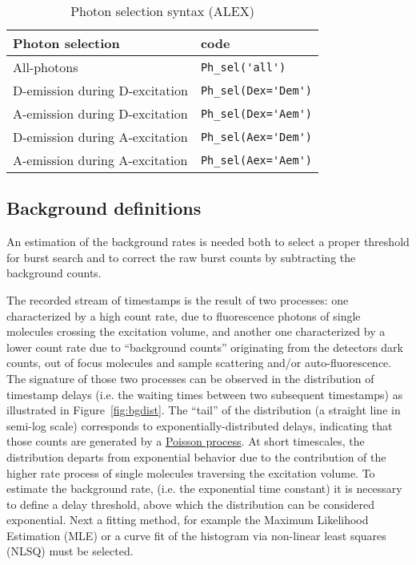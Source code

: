 \begin{table}
\begin{tabular}{l|l}
  Photon selection  & code \\
  \hline
  All-photons & \verb|Ph_sel('all')|\\
  D-emission during D-excitation & \verb|Ph_sel(Dex='Dem')|\\
  A-emission during D-excitation & \verb|Ph_sel(Dex='Aem')|\\
  D-emission during A-excitation & \verb|Ph_sel(Aex='Dem')|\\
  A-emission during A-excitation & \verb|Ph_sel(Aex='Aem')|\\
\end{tabular}
\caption{\label{tab:ph_sel_alex}Photon selection syntax (ALEX)}
\end{table}

\subsection{Background definitions}
\label{sec:bg_intro}

An estimation of the background rates is needed both to select a proper threshold for
burst search and to correct the raw burst counts by subtracting the background counts.

The recorded stream of timestamps is the result of two processes: one characterized
by a high count rate, due to fluorescence photons of single molecules crossing the
excitation volume, and another one characterized by a lower count rate due to “background
counts” originating from the detectors dark counts, out of focus molecules
and sample scattering and/or auto-fluorescence\cite{Gopich_2008}.
The signature of those two processes can be
observed in the distribution of timestamp delays (i.e. the waiting times
between two subsequent timestamps) as illustrated in Figure~\ref{fig:bgdist}.
The “tail” of the distribution (a straight line in semi-log scale) corresponds
to exponentially-distributed delays, indicating that those counts are generated by a
\href{http://en.wikipedia.org/wiki/Poisson_process}{Poisson process}. At short
timescales, the distribution departs from exponential behavior due to the contribution
of the higher rate process of single molecules traversing the excitation volume.
To estimate the background rate, (i.e. the exponential time constant)
it is necessary to define a delay threshold, above which the distribution
can be considered exponential.
Next a fitting method, for example the Maximum
Likelihood Estimation (MLE) or a curve fit of the histogram via non-linear
least squares (NLSQ) must be selected.

